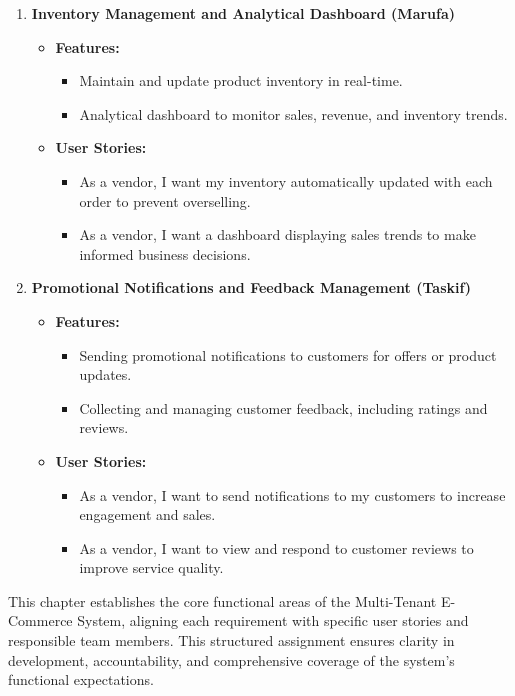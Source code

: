 \begin{enumerate}
    \item \textbf{Inventory Management and Analytical Dashboard (Marufa)}
    \begin{itemize}
        \item \textbf{Features:}
        \begin{itemize}
            \item Maintain and update product inventory in real-time.
            \item Analytical dashboard to monitor sales, revenue, and inventory trends.
        \end{itemize}
        \item \textbf{User Stories:}
        \begin{itemize}
            \item As a vendor, I want my inventory automatically updated with each order to prevent overselling.
            \item As a vendor, I want a dashboard displaying sales trends to make informed business decisions.
        \end{itemize}
    \end{itemize}

    \item \textbf{Promotional Notifications and Feedback Management (Taskif)}
    \begin{itemize}
        \item \textbf{Features:}
        \begin{itemize}
            \item Sending promotional notifications to customers for offers or product updates.
            \item Collecting and managing customer feedback, including ratings and reviews.
        \end{itemize}
        \item \textbf{User Stories:}
        \begin{itemize}
            \item As a vendor, I want to send notifications to my customers to increase engagement and sales.
            \item As a vendor, I want to view and respond to customer reviews to improve service quality.
        \end{itemize}
    \end{itemize}
\end{enumerate}

This chapter establishes the core functional areas of the Multi-Tenant E-Commerce System, aligning each requirement with specific user stories and responsible team members. This structured assignment ensures clarity in development, accountability, and comprehensive coverage of the system’s functional expectations.

\clearpage
